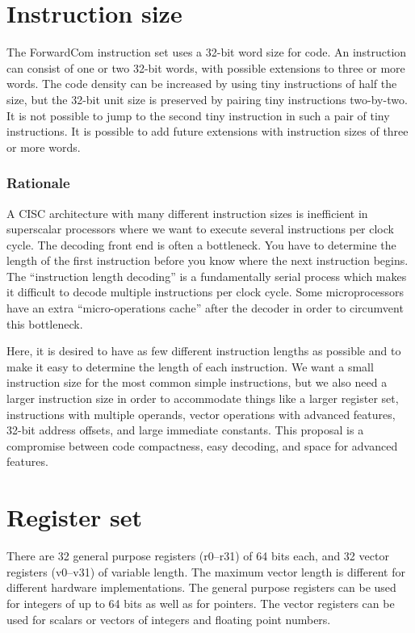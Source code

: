 \documentclass[forwardcom.tex]{subfiles}
\begin{document}
\section{Instruction size}
The ForwardCom instruction set uses a 32-bit word size for code. An instruction can consist of one or two 32-bit words, with possible extensions to three or more words. The code density can be increased by using tiny instructions of half the size, but the 32-bit unit size is preserved by pairing tiny instructions two-by-two. It is not possible to jump to the second tiny instruction in such a pair of tiny instructions. It is possible to add future extensions with instruction sizes of three or more words.

\subsubsection{Rationale}
A CISC architecture with many different instruction sizes is inefficient in superscalar processors where we want to execute several instructions per clock cycle. The decoding front end is often a bottleneck. You have to determine the length of the first instruction before you know where the next instruction begins. The ``instruction length decoding'' is a fundamentally serial process which makes it difficult to decode multiple instructions per clock cycle. Some microprocessors have an extra ``micro-operations cache'' after the decoder in order to circumvent this bottleneck.
\vspace{2mm}

Here, it is desired to have as few different instruction lengths as possible and to make it easy to determine the length of each instruction. We want a small instruction size for the most common simple instructions, but we also need a larger instruction size in order to accommodate things like a larger register set, instructions with multiple operands, vector operations with advanced features, 32-bit address offsets, and large immediate constants. This proposal is a compromise between code compactness, easy decoding, and space for advanced features.

\section{Register set}
There are 32 general purpose registers (r0--r31) of 64 bits each, and 32 vector registers (v0--v31) of variable length. The maximum vector length is different for different hardware implementations. The general purpose registers can be used for integers of up to 64 bits as well as for pointers. The vector registers can be used for scalars or vectors of integers and floating point numbers. 
\vspace{2mm}
\end{document}
